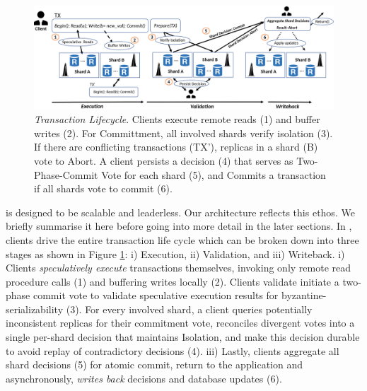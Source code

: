 
\begin{figure}[!th]
\begin{center}
\includegraphics[width= \textwidth]{./figures/Archi.png}
\end{center}
\caption{{\em Transaction Lifecycle}. Clients execute remote reads (1) and buffer writes (2). For Committment, all involved shards verify isolation (3). If there are conflicting transactions (TX'), replicas in a shard (B) vote to Abort. A client persists a decision (4) that serves as Two-Phase-Commit Vote for each shard (5), and Commits a transaction if all shards vote to commit (6).}
\label{fig:Figure1}
\end{figure}
\sys is designed to be scalable and leaderless. Our architecture reflects this ethos. We briefly summarise it here before going into more detail in the later sections. 
In \sys, clients drive the entire transaction life cycle which can be broken down into three stages as shown in Figure \ref{fig:Figure1}: i) Execution, ii) Validation, and iii) Writeback. 
i) Clients \textit{speculatively execute} transactions themselves, invoking only remote read procedure calls (1) and buffering writes locally (2). \two Clients validate initiate a two-phase commit vote to validate speculative execution results for byzantine-serializability (3).
For every involved shard, a client queries potentially inconsistent replicas for their commitment vote, reconciles divergent votes into a single per-shard decision that maintains Isolation, and make this decision durable to avoid replay of contradictory decisions (4). 
iii) Lastly, clients aggregate all shard decisions (5) for atomic commit, return to the application and asynchronously, \textit{writes back} decisions and database updates (6).


